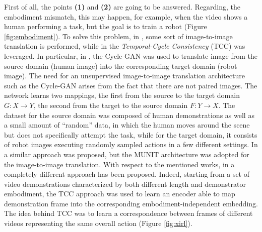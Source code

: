 First of all, the points \textbf{(1)} and \textbf{(2)} are going to be answered. Regarding, the embodiment mismatch, this may happen, for example, when the video shows a human performing a task, but the goal is to train a robot (Figure \ref{fig:embodiment}).%
To solve this problem, in \cite{smith2019avid,xiong2021learning_by_watching,li2021meta_watching_video_demonstration}, some sort of image-to-image translation is performed,  while in \cite{zakka2022xirl} the \textit{Temporal-Cycle Consistency} (TCC) \cite{dwibedi2019tcc} was leveraged. In particular, in \cite{smith2019avid,li2021meta_watching_video_demonstration}, the Cycle-GAN \cite{zhu2017cycle_gan} was used to translate image from the source domain (human image) into the corresponding target domain (robot image). The need for an unsupervised image-to-image translation architecture such as the Cycle-GAN arises from the fact that there are not paired images. The network learns two mappings, the first from the source to the target domain $G : X \rightarrow Y$, the second from the target to the source domain $F : Y \rightarrow X$. The dataset for the source domain was composed of human demonstrations as well as a small amount of ``random” data, in which the human moves around the scene but does not specifically attempt the task, while for the target domain, it consists of  robot images executing randomly sampled actions in a few different settings. In \cite{xiong2021learning_by_watching} a similar approach was proposed, but the MUNIT \cite{huang2018munit} architecture was adopted for the image-to-image translation. With respect to the mentioned works, in \cite{zakka2022xirl} a completely different approach has been proposed. Indeed, starting from a set of video demonstrations characterized by both different length and demonstrator embodiment, the TCC approach was used to learn an encoder able to map demonstration frame into the corresponding embodiment-independent embedding. The idea behind TCC was to learn a correspondence between frames of different videos representing the same overall action (Figure \ref{fig:xirl}).
